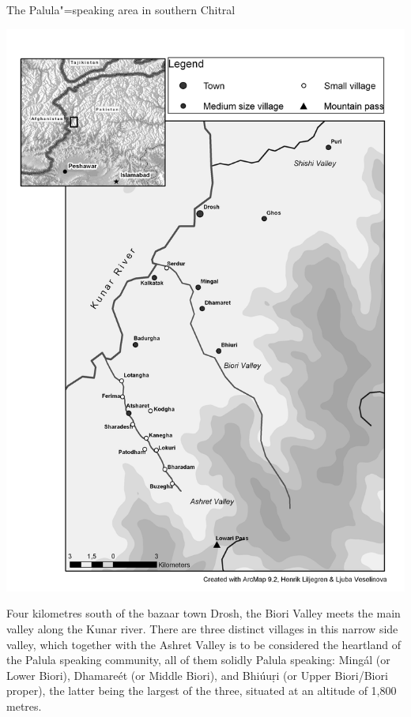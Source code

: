 \begin{mapfigure}[p!]
\caption{The Palula"=speaking area in southern Chitral}
\includegraphics[width=.95\textwidth]{figures/ch1map1.png}
\label{map:1-1}
\end{mapfigure}


Four kilometres south of the bazaar town Drosh, the Biori Valley meets the main valley along the Kunar river. There are three distinct villages in this narrow side valley, which together with the Ashret Valley is to be considered the heartland of the Palula speaking community, all of them solidly Palula speaking: Mingál (or Lower Biori), Dhamareét (or Middle Biori), and Bhiúuṛi (or Upper Biori/Biori proper), the latter being the largest of the three, situated at an altitude of 1,800 metres. 


